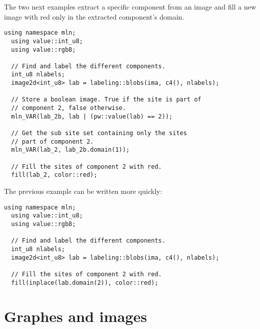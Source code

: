 \documentclass{report}
\begin{document}
The two next examples extract a specific component from an image and fill a new
image with red only in the extracted component's domain.
\begin{lstlisting}[frame=single]
  using namespace mln;
  using value::int_u8;
  using value::rgb8;

  // Find and label the different components.
  int_u8 nlabels;
  image2d<int_u8> lab = labeling::blobs(ima, c4(), nlabels);

  // Store a boolean image. True if the site is part of
  // component 2, false otherwise.
  mln_VAR(lab_2b, lab | (pw::value(lab) == 2));

  // Get the sub site set containing only the sites
  // part of component 2.
  mln_VAR(lab_2, lab_2b.domain(1));

  // Fill the sites of component 2 with red.
  fill(lab_2, color::red);
\end{lstlisting}

The previous example can be written more quickly:
\begin{lstlisting}[frame=single]
  using namespace mln;
  using value::int_u8;
  using value::rgb8;

  // Find and label the different components.
  int_u8 nlabels;
  image2d<int_u8> lab = labeling::blobs(ima, c4(), nlabels);

  // Fill the sites of component 2 with red.
  fill(inplace(lab.domain(2)), color::red);
\end{lstlisting}


\chapter{Graphes and images}
\end{document}
